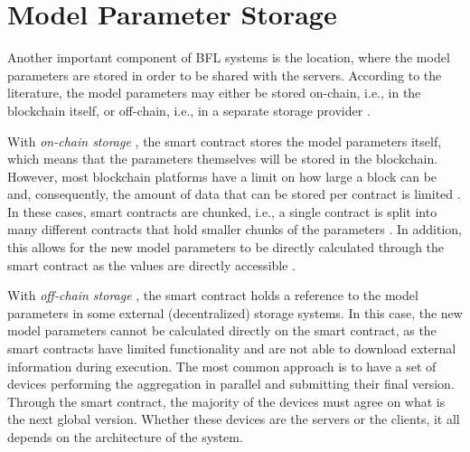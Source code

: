
\section{Model Parameter Storage}\label{related_work:param_storage}

Another important component of BFL systems is the location, where the model parameters are stored in order to be shared with the servers. According to the literature, the model parameters may either be stored on-chain, i.e., in the blockchain itself, or off-chain, i.e., in a separate storage provider \cite{10.48550/arxiv.2104.10501}.

With \textit{on-chain storage} \cite{9274451, baffle, demo, 8733825, 9524833, 8894364, 9184854, 8893114}, the smart contract stores the model parameters itself, which means that the parameters themselves will be stored in the blockchain. However, most blockchain platforms have a limit on how large a block can be and, consequently, the amount of data that can be stored per contract is limited \cite{9274451}. In these cases, smart contracts are chunked, i.e., a single contract is split into many different contracts that hold smaller chunks of the parameters \cite{baffle}. In addition, this allows for the new model parameters to be directly calculated through the smart contract as the values are directly accessible  \cite{9274451}.
    
With \textit{off-chain storage} \cite{10.1145/3319535.3363256, 10.48550/arxiv.2011.07516, 8945913, 10.48550/arxiv.2202.02817, 10.48550/arxiv.2007.03856, 10.48550/arxiv.1910.12603, Peyvandi2022, 9170559}, the smart contract holds a reference to the model parameters in some external (decentralized) storage systems. In this case, the new model parameters cannot be calculated directly on the smart contract, as the smart contracts have limited functionality and are not able to download external information during execution. The most common approach is to have a set of devices performing the aggregation in parallel and submitting their final version. Through the smart contract, the majority of the devices must agree on what is the next global version. Whether these devices are the servers or the clients, it all depends on the architecture of the system.



